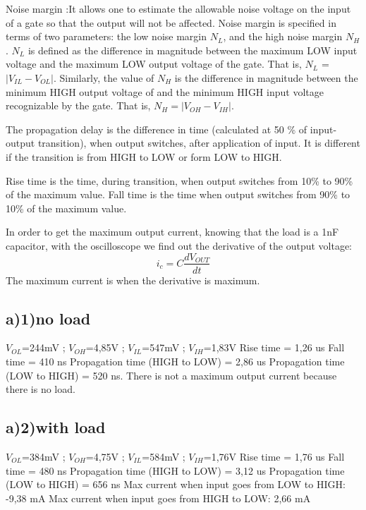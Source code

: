 \documentclass[a4paper,12pt]{article}
\begin{document}
Noise margin :It allows one to estimate the allowable noise voltage on the input of a 
gate so that the output will not be affected. Noise margin is specified
 in terms of two parameters: the low noise margin $N_{L}$, and the high noise 
 margin $N_{H}$ . $N_{L}$ is defined as the difference in magnitude
  between the maximum LOW input voltage and the maximum 
  LOW output voltage of the gate. That is, $N_{L}$ =$|V_{IL} - V_{OL}|$.
   Similarly, the value of $N_{H}$ is the difference in 
   magnitude between the minimum HIGH output voltage of 
   and the minimum HIGH input voltage recognizable by 
   the gate. That is, $N_{H} =|V_{OH} - V_{IH}|.$ 


The propagation delay  is the difference in time (calculated at 50
\% of input-output transition), when output switches, after 
application of input. It is different if the transition is
 from HIGH to LOW or form LOW to HIGH.

 Rise time is the time, during transition, when output switches from 10\% to 90\% of the maximum value.
Fall time is the time when output switches from 90\% to 10\% of the maximum value.

In order to get the maximum output current, knowing that the
 load is a 1nF capacitor, with the oscilloscope we find out
  the derivative of the output voltage:
\begin{equation}
    i_{c}=C\frac{dV_{OUT}}{dt}
\end{equation}
The maximum current is when the derivative is maximum.
\subsection*{a)1)no load}
$V_{OL}$=244mV ;
$V_{OH}$=4,85V ; 
$V_{IL}$=547mV ;
$V_{IH}$=1,83V
\newline
Rise time = 1,26 us 
\newline
Fall time = 410 ns 
\newline 
Propagation time (HIGH to LOW) = 2,86 us 
\newline
Propagation time (LOW to HIGH) = 520 ns.
\newline
There is not a maximum output current because there is no load.

\subsection*{a)2)with load} 

$V_{OL}$=384mV ; 
$V_{OH}$=4,75V ; 
$V_{IL}$=584mV ;
$V_{IH}$=1,76V 
\newline
Rise time = 1,76 us
\newline
Fall time = 480 ns
\newline
Propagation time (HIGH to LOW) = 3,12 us
\newline
Propagation time (LOW to HIGH) = 656 ns
\newline
Max current when input goes from LOW to HIGH: -9,38 mA
\newline
Max current when input goes from HIGH to LOW: 2,66 mA
\end{document}
